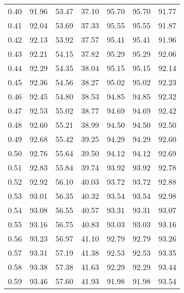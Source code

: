 \begin{tabular}{|c|c|c|c|c|c|c|}
      0.40 &     91.96 &     53.47 &      37.10 &   95.70 &      95.70 &         91.77 \\
      0.41 &     92.04 &     53.69 &      37.33 &   95.55 &      95.55 &         91.87 \\
      0.42 &     92.13 &     53.92 &      37.57 &   95.41 &      95.41 &         91.96 \\
      0.43 &     92.21 &     54.15 &      37.82 &   95.29 &      95.29 &         92.06 \\
      0.44 &     92.29 &     54.35 &      38.04 &   95.15 &      95.15 &         92.14 \\
      0.45 &     92.36 &     54.56 &      38.27 &   95.02 &      95.02 &         92.23 \\
      0.46 &     92.45 &     54.80 &      38.53 &   94.85 &      94.85 &         92.32 \\
      0.47 &     92.53 &     55.02 &      38.77 &   94.69 &      94.69 &         92.42 \\
      0.48 &     92.60 &     55.21 &      38.99 &   94.50 &      94.50 &         92.50 \\
      0.49 &     92.68 &     55.42 &      39.25 &   94.29 &      94.29 &         92.60 \\
      0.50 &     92.76 &     55.64 &      39.50 &   94.12 &      94.12 &         92.69 \\
      0.51 &     92.83 &     55.84 &      39.74 &   93.92 &      93.92 &         92.78 \\
      0.52 &     92.92 &     56.10 &      40.03 &   93.72 &      93.72 &         92.88 \\
      0.53 &     93.01 &     56.35 &      40.32 &   93.54 &      93.54 &         92.98 \\
      0.54 &     93.08 &     56.55 &      40.57 &   93.31 &      93.31 &         93.07 \\
      0.55 &     93.16 &     56.75 &      40.83 &   93.03 &      93.03 &         93.16 \\
      0.56 &     93.23 &     56.97 &      41.10 &   92.79 &      92.79 &         93.26 \\
      0.57 &     93.31 &     57.19 &      41.38 &   92.53 &      92.53 &         93.35 \\
      0.58 &     93.38 &     57.38 &      41.63 &   92.29 &      92.29 &         93.44 \\
      0.59 &     93.46 &     57.60 &      41.93 &   91.98 &      91.98 &         93.54 \\

\end{tabular}
